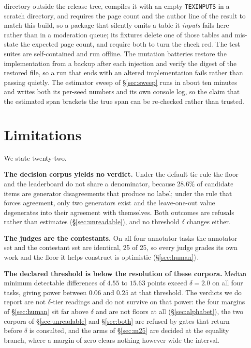 \documentclass{article}
\begin{document}
directory outside the release tree, compiles it with an empty \texttt{TEXINPUTS} in a scratch directory, and requires the page count and the author line of the result to match this build, so a package that silently omits a table it \emph{inputs} fails here rather than in a moderation queue; its fixtures delete one of those tables and mis-state the expected page count, and require both to turn the check red. The test suites are self-contained and run offline. The mutation batteries restore the implementation from a backup after each injection and verify the digest of the restored file, so a run that ends with an altered implementation fails rather than passing quietly. The estimator sweep of \S\ref{sec:sweep} runs in about ten minutes and writes both its per-seed numbers and its own console log, so the claim that the estimated span brackets the true span can be re-checked rather than trusted.
\section{Limitations}
\label{sec:limits} We state twenty-two.

\textbf{The decision corpus yields no verdict.} Under the default tie rule the floor and the leaderboard do not share a denominator, because 28.6\% of candidate items are generator disagreements that produce no label; under the rule that forces agreement, only two generators exist and the leave-one-out value degenerates into their agreement with themselves. Both outcomes are refusals rather than estimates (\S\ref{sec:unreadable}), and no threshold $\delta$ changes either.

\textbf{The judges are the contestants.} On all four annotator tasks the annotator set and the contestant set are identical, 25 of 25, so every judge grades its own work and the floor it helps construct is optimistic (\S\ref{sec:human}).

\textbf{The declared threshold is below the resolution of these corpora.} Median minimum detectable differences of $4.55$ to $15.63$ points exceed $\delta = 2.0$ on all four tasks, giving power between $0.06$ and $0.25$ at that threshold. The verdicts we do report are not $\delta$-tier readings and do not survive on that power: the four margins of \S\ref{sec:human} sit far above $\delta$ and are not floors at all (\S\ref{sec:alphabet}), the two corpora of \S\ref{sec:unreadable} and \S\ref{sec:both} are refused by gates that return before $\delta$ is consulted, and the arms of \S\ref{sec:m25} are decided at the equality branch, where a margin of zero clears nothing however wide the interval.
\end{document}
